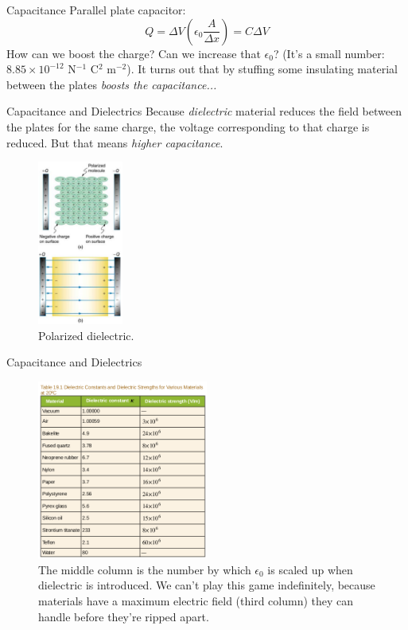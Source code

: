 \documentclass{beamer}
\begin{document}
\begin{frame}{Capacitance}
Parallel plate capacitor:
\begin{equation}
\boxed{
Q = \Delta V \left(\epsilon_0 \frac{A}{\Delta x}\right) = C\Delta V}
\end{equation}
How can we boost the charge?  Can we increase that $\epsilon_0$?  (It's a small number: $8.85 \times 10^{-12}$ N$^{-1}$ C$^2$ m$^{-2}$).  It turns out that by stuffing some insulating material between the plates \textit{boosts the capacitance...}
\end{frame}

\begin{frame}{Capacitance and Dielectrics}
Because \textit{dielectric} material reduces the field between the plates for the same charge, the voltage corresponding to that charge is reduced.  But that means \textit{higher capacitance}.
\begin{figure}
\centering
\includegraphics[width=0.25\textwidth]{figures/polar.png}
\caption{\label{fig:polar} Polarized dielectric.}
\end{figure}
\end{frame}

\begin{frame}{Capacitance and Dielectrics}
\begin{figure}
\centering
\includegraphics[width=0.5\textwidth]{figures/tableK.png}
\caption{\label{fig:tab} The middle column is the number by which $\epsilon_0$ is scaled up when dielectric is introduced.  We can't play this game indefinitely, because materials have a maximum electric field (third column) they can handle before they're ripped apart.}
\end{figure}
\end{frame}
\end{document}
